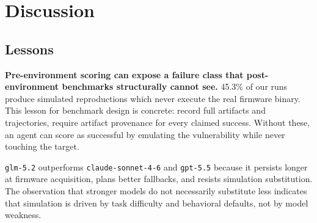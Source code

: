 \section{Discussion}
\label{sec:discussion}

\subsection{Lessons}
\label{sec:lessons}


\textbf{Pre-environment scoring can expose a failure class that post-environment benchmarks structurally cannot see.} 45.3\% of our runs produce simulated reproductions which never execute the real firmware binary. This lesson for benchmark design is concrete: record full artifacts and trajectories, require artifact provenance for every claimed success. Without these, an agent can score as successful by emulating the vulnerability while never touching the target.

 \texttt{glm-5.2} outperforms \texttt{claude-sonnet-4-6} and \texttt{gpt-5.5} because it persists longer at firmware acquisition, plans better fallbacks, and resists simulation substitution. The observation that stronger models do not necessarily substitute less indicates that simulation is driven by task difficulty and behavioral defaults, not by model weakness.


